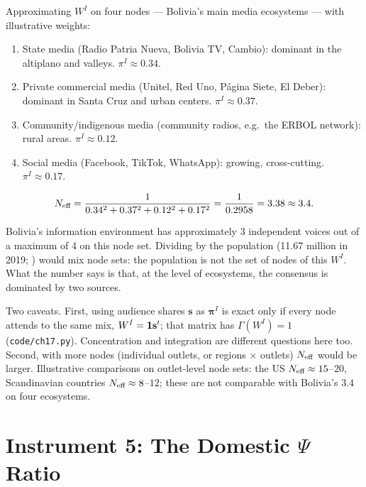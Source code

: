 \documentclass[../structural_economics_book.tex]{subfiles}
\begin{document}
\begin{example}\label{ch17:ex:bolivia_neff}
Approximating $W^I$ on four nodes --- Bolivia's main media ecosystems --- with illustrative weights:
\begin{enumerate}
\item State media (Radio Patria Nueva, Bolivia TV, Cambio): dominant in the altiplano and valleys. $\pi^I \approx 0.34$.
\item Private commercial media (Unitel, Red Uno, P\'{a}gina Siete, El Deber): dominant in Santa Cruz and urban centers. $\pi^I \approx 0.37$.
\item Community/indigenous media (community radios, e.g.\ the ERBOL network): rural areas. $\pi^I \approx 0.12$.
\item Social media (Facebook, TikTok, WhatsApp): growing, cross-cutting. $\pi^I \approx 0.17$.
\end{enumerate}

\[
N_{\text{eff}} = \frac{1}{0.34^2 + 0.37^2 + 0.12^2 + 0.17^2} = \frac{1}{0.2958} = 3.38 \approx 3.4.
\]

Bolivia's information environment has approximately 3 independent voices out of a maximum of 4 on this node set. Dividing by the population (11.67 million in 2019; \citealp{worldbank2026wdi}) would mix node sets: the population is not the set of nodes of this $W^I$. What the number says is that, at the level of ecosystems, the consensus is dominated by two sources.

Two caveats. First, using audience shares $\mathbf{s}$ as $\boldsymbol{\pi}^I$ is exact only if every node attends to the same mix, $W^I = \mathbf{1}\mathbf{s}'$; that matrix has $\Gamma(W^I) = 1$ (\texttt{code/ch17.py}). Concentration and integration are different questions here too. Second, with more nodes (individual outlets, or regions $\times$ outlets) $N_{\text{eff}}$ would be larger. Illustrative comparisons on outlet-level node sets: the US $N_{\text{eff}} \approx 15$--$20$, Scandinavian countries $N_{\text{eff}} \approx 8$--$12$; these are not comparable with Bolivia's $3.4$ on four ecosystems.
\end{example}


\section{Instrument 5: The Domestic $\Psi$ Ratio}
\label{ch17:sec:psi}
\end{document}
